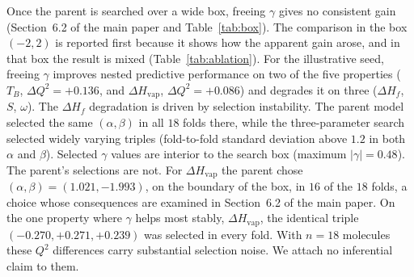 \documentclass[a5paper, 10pt]{article}
\theoremstyle{plain}
\theoremstyle{remark}
\theoremstyle{definition}
\begin{document}
Once the parent is searched over a wide
box, freeing $\gamma$ gives no consistent gain
(Section~6.2 of the main paper and Table~\ref{tab:box}). The comparison in the
box $(-2,2)$ is reported first because it shows how the apparent
gain arose, and in that box the result is mixed
(Table~\ref{tab:ablation}). For the illustrative seed, freeing $\gamma$
improves nested predictive performance on two of the five properties
($T_B$, $\Delta Q^2 = +0.136$, and $\Delta H_{\mathrm{vap}}$,
$\Delta Q^2 = +0.086$) and degrades it on three
($\Delta H_f$, $S$, $\omega$). The $\Delta H_f$ degradation is driven
by selection instability. The parent model selected the same
$(\alpha,\beta)$ in all $18$ folds there, while the three-parameter
search selected widely varying triples (fold-to-fold standard
deviation above $1.2$ in both $\alpha$ and $\beta$). Selected
$\gamma$ values are interior to the search box (maximum
$|\gamma| = 0.48$). The parent's selections are not. For
$\Delta H_{\mathrm{vap}}$ the parent chose $(\alpha,\beta) =
(1.021, -1.993)$, on the boundary of the box, in $16$ of the $18$
folds, a choice whose consequences are examined in Section~6.2
of the main paper. On the one property where
$\gamma$ helps most stably, $\Delta H_{\mathrm{vap}}$, the identical
triple $(-0.270, +0.271, +0.239)$ was selected in every fold. With
$n = 18$ molecules these $Q^2$ differences carry substantial
selection noise. We attach no inferential claim to them.
\end{document}
